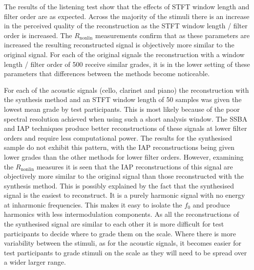 %
%
		The results of the listening test show that the effects of STFT window length and filter order are as
		expected. Across the majority of the stimuli there is an increase in the perceived quality of the
		reconstruction as the STFT window length / filter order is increased. The $R_{\mathrm{nonlin}}$
		measurements confirm that as these parameters are increased the resulting reconstructed signal is
		objectively more similar to the original signal. For each of the original signals the reconstruction with a
		window length / filter order of 500 receive similar grades, it is in the lower setting of these parameters
		that differences between the methods become noticeable.

		For each of the acoustic signals (cello, clarinet and piano) the reconstruction with the synthesis method
		and an STFT window length of 50 samples was given the lowest mean grade by test participants. This is most
		likely because of the poor spectral resolution achieved when using such a short analysis window. The SSBA
		and IAP techniques produce better reconstructions of these signals at lower filter orders and require less
		computational power. The results for the synthesised sample do not exhibit this pattern, with the IAP
		reconstructions being given lower grades than the other methods for lower filter orders. However, examining
		the $R_{\mathrm{nonlin}}$ measures it is seen that the IAP reconstructions of this signal are objectively
		more similar to the original signal than those reconstructed with the synthesis method. This is possibly
		explained by the fact that the synthesised signal is the easiest to reconstruct. It is a purely harmonic
		signal with no energy at inharmonic frequencies. This makes it easy to isolate the $f_{0}$ and produce
		harmonics with less intermodulation components. As all the reconstructions of the synthesised signal are
		similar to each other it is more difficult for test participants to decide where to grade them on the
		scale.  Where there is more variability between the stimuli, as for the acoustic signals, it becomes easier
		for test participants to grade stimuli on the scale as they will need to be spread over a wider larger
		range.

